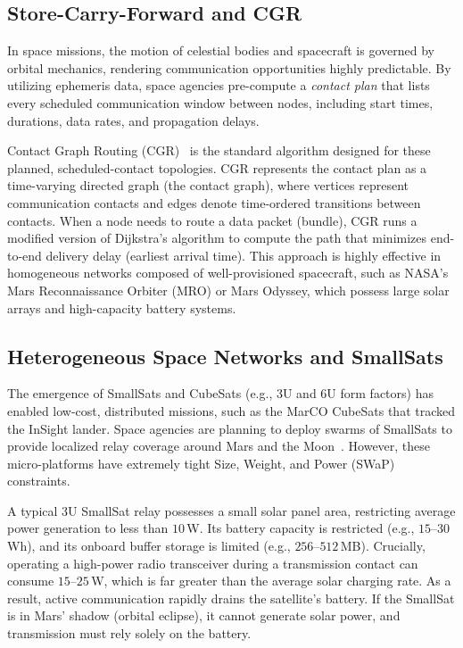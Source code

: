 \documentclass[a4paper,fleqn]{cas-dc}
\begin{document}
\subsection{Store-Carry-Forward and CGR}
In space missions, the motion of celestial bodies and spacecraft is governed by orbital mechanics, rendering communication opportunities highly predictable. By utilizing ephemeris data, space agencies pre-compute a \emph{contact plan} that lists every scheduled communication window between nodes, including start times, durations, data rates, and propagation delays. 

Contact Graph Routing (CGR)~\cite{burleigh2010cgr} is the standard algorithm designed for these planned, scheduled-contact topologies. CGR represents the contact plan as a time-varying directed graph (the contact graph), where vertices represent communication contacts and edges denote time-ordered transitions between contacts. When a node needs to route a data packet (bundle), CGR runs a modified version of Dijkstra's algorithm to compute the path that minimizes end-to-end delivery delay (earliest arrival time). This approach is highly effective in homogeneous networks composed of well-provisioned spacecraft, such as NASA's Mars Reconnaissance Orbiter (MRO) or Mars Odyssey, which possess large solar arrays and high-capacity battery systems.

\subsection{Heterogeneous Space Networks and SmallSats}
The emergence of SmallSats and CubeSats (e.g., 3U and 6U form factors) has enabled low-cost, distributed missions, such as the MarCO CubeSats that tracked the InSight lander. Space agencies are planning to deploy swarms of SmallSats to provide localized relay coverage around Mars and the Moon~\cite{nasa2022artemis,yang2016smallsat}. However, these micro-platforms have extremely tight Size, Weight, and Power (SWaP) constraints. 

A typical 3U SmallSat relay possesses a small solar panel area, restricting average power generation to less than $10\,$W. Its battery capacity is restricted (e.g., $15$--$30\,$Wh), and its onboard buffer storage is limited (e.g., $256$--$512\,$MB). Crucially, operating a high-power radio transceiver during a transmission contact can consume $15$--$25\,$W, which is far greater than the average solar charging rate. As a result, active communication rapidly drains the satellite's battery. If the SmallSat is in Mars' shadow (orbital eclipse), it cannot generate solar power, and transmission must rely solely on the battery.
\end{document}
